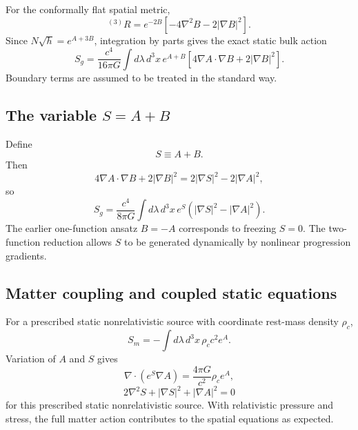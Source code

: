 \documentclass[11pt]{article}
\begin{document}
For the conformally flat spatial metric,
\begin{equation}
    {}^{(3)}R
    =e^{-2B}\left[-4\nabla^2B-2|\nabla B|^2\right].
    \label{eq:R3}
\end{equation}
Since $N\sqrt h=e^{A+3B}$, integration by parts gives the exact static bulk action
\begin{equation}
    \boxed{
    S_g=\frac{c^4}{16\pi G}
    \int d\lambda\,d^3x\,
    e^{A+B}
    \left[4\nabla A\cdot\nabla B+2|\nabla B|^2\right].}
    \label{eq:AB_action}
\end{equation}
Boundary terms are assumed to be treated in the standard way.

\subsection{The variable \texorpdfstring{$S=A+B$}{S=A+B}}

Define
\begin{equation}
    S\equiv A+B.
\end{equation}
Then
\begin{equation}
    4\nabla A\cdot\nabla B+2|\nabla B|^2
    =2|\nabla S|^2-2|\nabla A|^2,
\end{equation}
so
\begin{equation}
    \boxed{
    S_g=\frac{c^4}{8\pi G}
    \int d\lambda\,d^3x\,
    e^S\left(|\nabla S|^2-|\nabla A|^2\right).}
    \label{eq:AS_action}
\end{equation}
The earlier one-function ansatz $B=-A$ corresponds to freezing $S=0$. The two-function reduction allows $S$ to be generated dynamically by nonlinear progression gradients.

\subsection{Matter coupling and coupled static equations}

For a prescribed static nonrelativistic source with coordinate rest-mass density $\rho_c$,
\begin{equation}
    S_m=-\int d\lambda\,d^3x\,\rho_c c^2 e^A.
    \label{eq:dust_action}
\end{equation}
Variation of $A$ and $S$ gives
\begin{equation}
    \boxed{
    \nabla\cdot(e^S\nabla A)
    =\frac{4\pi G}{c^2}\rho_c e^A,}
    \label{eq:A_eq}
\end{equation}
\begin{equation}
    \boxed{
    2\nabla^2S+|\nabla S|^2+|\nabla A|^2=0}
    \label{eq:S_eq}
\end{equation}
for this prescribed static nonrelativistic source. With relativistic pressure and stress, the full matter action contributes to the spatial equations as expected.
\end{document}
